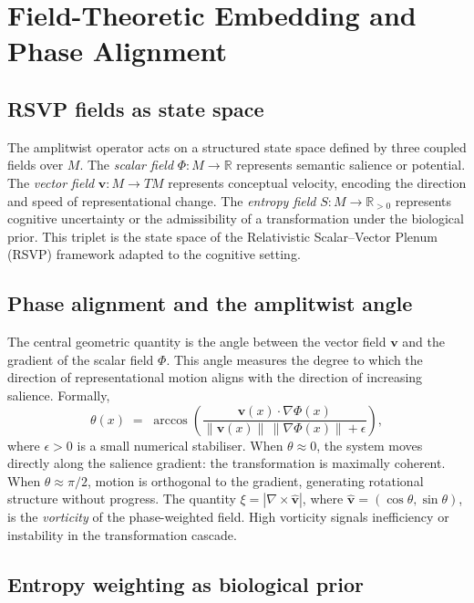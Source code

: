 \documentclass[12pt, a4paper]{article}
\theoremstyle{remark}
\theoremstyle{definition}
\newcommand{\vv}{\mathbf{v}}
\newcommand{\Phif}{\Phi}
\begin{document}
\section{Field-Theoretic Embedding and Phase Alignment}
\label{sec:field}

\subsection{RSVP fields as state space}

The amplitwist operator acts on a structured state space defined by three coupled fields
over $M$.  The \emph{scalar field} $\Phif \colon M \to \mathbb{R}$ represents semantic
salience or potential.  The \emph{vector field} $\vv \colon M \to TM$ represents
conceptual velocity, encoding the direction and speed of representational change.  The
\emph{entropy field} $S \colon M \to \mathbb{R}_{>0}$ represents cognitive uncertainty or
the admissibility of a transformation under the biological prior.  This triplet is the
state space of the Relativistic Scalar--Vector Plenum (RSVP) framework adapted to the
cognitive setting.

\subsection{Phase alignment and the amplitwist angle}

The central geometric quantity is the angle between the vector field $\vv$ and the gradient
of the scalar field $\Phif$.  This angle measures the degree to which the direction of
representational motion aligns with the direction of increasing salience.  Formally,
\begin{equation}
  \theta(x) \;=\; \arccos\!\left(
    \frac{\vv(x) \cdot \nabla\Phif(x)}{\|\vv(x)\|\,\|\nabla\Phif(x)\| + \epsilon}
  \right),
  \label{eq:phase}
\end{equation}
where $\epsilon > 0$ is a small numerical stabiliser.  When $\theta \approx 0$, the system
moves directly along the salience gradient: the transformation is maximally coherent.  When
$\theta \approx \pi/2$, motion is orthogonal to the gradient, generating rotational
structure without progress.  The quantity $\xi = |\nabla \times \hat{\vv}|$, where
$\hat{\vv} = (\cos\theta, \sin\theta)$, is the \emph{vorticity} of the phase-weighted
field.  High vorticity signals inefficiency or instability in the transformation cascade.

\subsection{Entropy weighting as biological prior}
\end{document}
